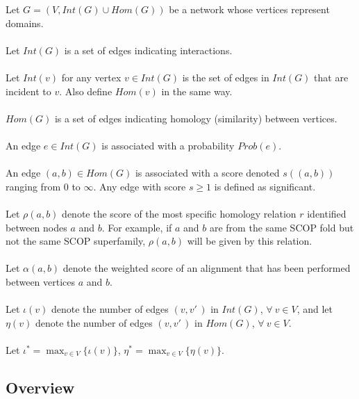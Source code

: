 \documentclass[11pt]{article}
\begin{document}
Let $G = (V,Int(G) \cup Hom(G))$ be a network whose vertices represent domains.\\\\
Let $Int(G)$ is a set of edges indicating interactions.\\\\
Let $Int(v)$ for any vertex $v \in Int(G)$ is the set of edges in $Int(G)$ that are incident to $v$. Also define $Hom(v)$ in the same way.\\\\
$Hom(G)$ is a set of edges indicating homology (similarity) between vertices.\\\\
An edge $e \in Int(G)$ is associated with a probability $Prob(e)$.\\\\
An edge $(a,b) \in Hom(G)$ is associated with a score denoted $s((a,b))$ ranging from $0$ to $\infty$. Any edge with score $s \geq 1$ is defined as significant.\\\\
Let $\rho(a,b)$ denote the score of the most specific homology relation $r$ identified between nodes $a$ and $b$. For example, if $a$ and $b$ are from the same SCOP fold but not the same SCOP superfamily, $\rho(a,b)$ will be given by this relation.\\\\
Let $\alpha(a,b)$ denote the weighted score of an alignment that has been performed between vertices $a$ and $b$.\\\\
Let $\iota(v)$ denote the number of edges $(v, v'\,\!)$ in $Int(G)$, $\forall \: v \in V$, and let $\eta(v)$ denote the number of edges $(v, v'\,\!)$ in $Hom(G)$, $\forall \: v \in V$.\\\\
Let $\iota^* = \displaystyle \max_{v \in V}\{\iota(v)\}$, $\eta^* = \displaystyle \max_{v \in V}\{\eta(v)\}$.
\subsection*{Overview}
\end{document}
